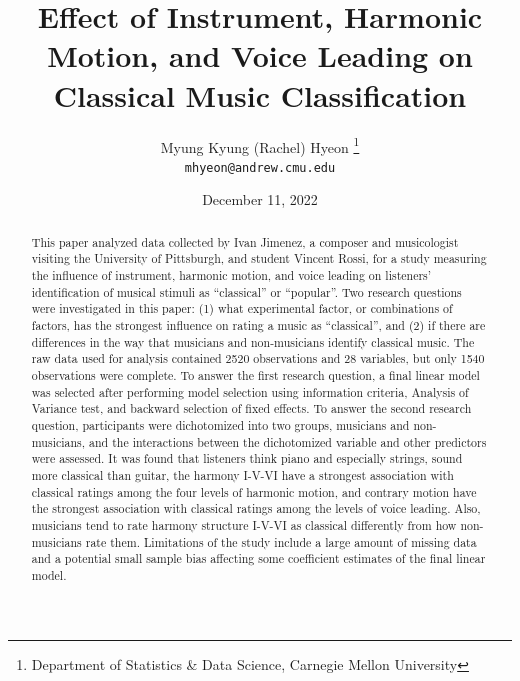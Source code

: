 \documentclass{article}
\begin{document}
\title{Effect of Instrument, Harmonic Motion, and Voice Leading on Classical Music Classification}
\author{Myung Kyung (Rachel) Hyeon \footnote{Department of Statistics \& Data Science, Carnegie Mellon University} \\\texttt{mhyeon@andrew.cmu.edu}}
\date{December 11, 2022}

\maketitle



\begin{abstract}
    This paper analyzed data collected by Ivan Jimenez, a composer and musicologist visiting the University of Pittsburgh, and student Vincent Rossi, for a study measuring the influence of instrument, harmonic motion, and voice leading on listeners' identification of musical stimuli as ``classical'' or ``popular''. Two research questions were investigated in this paper: (1) what experimental factor, or combinations of factors, has the strongest influence on rating a music as ``classical'', and (2) if there are differences in the way that musicians and non-musicians identify classical music. The raw data used for analysis contained 2520 observations and 28 variables, but only 1540 observations were complete. To answer the first research question, a final linear model was selected after performing model selection using information criteria, Analysis of Variance test, and backward selection of fixed effects. To answer the second research question, participants were dichotomized into two groups, musicians and non-musicians, and the interactions between the dichotomized variable and other predictors were assessed. It was found that listeners think piano and especially strings, sound more classical than guitar, the harmony I-V-VI have a strongest association with classical ratings among the four levels of harmonic motion, and contrary motion have the strongest association with classical ratings among the levels of voice leading. Also, musicians tend to rate harmony structure I-V-VI as classical differently from how non-musicians rate them. Limitations of the study include a large amount of missing data and a potential small sample bias affecting some coefficient estimates of the final linear model.
\end{abstract}
\end{document}
